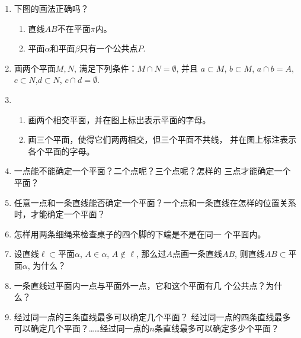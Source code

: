 \begin{ex}
\begin{enumerate}
  \item 下图的画法正确吗？
\begin{enumerate}
  \item 直线$AB$不在平面$\pi$内。
  \item 平面$\alpha$和平面$\beta$只有一个公共点$P$.
\end{enumerate}

\item 画两个平面$M,N$, 满足下列条件：$M\cap N=\emptyset$, 并且
  $a\subset M$, $b\subset M$, $a\cap b=A$, $c\subset N$,$d\subset N$, $c\cap d=\emptyset$.
  \item 
\begin{enumerate}
  \item 画两个相交平面，并在图上标出表示平面的字母。
  \item 画三个平面，使得它们两两相交，但三个平面不共线，
  并在图上标注表示各个平面的字母。
\end{enumerate}  
  \item 一点能不能确定一个平面？二个点呢？三个点呢？怎样的
  三点才能确定一个平面？
  \item 任意一点和一条直线能否确定一个平面？一个点和一条直线在怎样的位置关系时，才能确定一个平面？
  \item 怎样用两条细绳来检查桌子的四个脚的下端是不是在同一
  个平面内。
  \item 设直线$\ell\subset$平面$\alpha$, $A\in\alpha$, $A\notin \ell$, 那么过$A$点画一条直线$AB$, 则直线$AB\subset $平面$\alpha$, 为什么？
  \item 一条直线过平面内一点与平面外一点，它和这个平面有几
个公共点？为什么？
\item 经过同一点的三条直线最多可以确定几个平面？
经过同一点的四条直线最多可以确定几个平面？……经过同一点的$n$条直线最多可以确定多少个平面？
\end{enumerate}
\end{ex}


